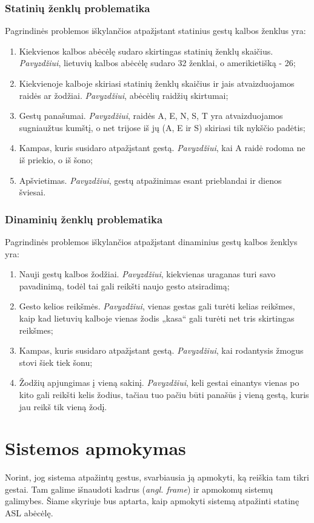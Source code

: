 \documentclass{VUMIFInfKursinis}
\begin{document}
\subsubsection{Statinių ženklų problematika}
Pagrindinės problemos iškylančios atpažįstant statinius gestų kalbos ženklus yra:
\begin{enumerate}
	\item Kiekvienos kalbos abėcėlę sudaro skirtingas statinių ženklų skaičius. \textit{Pavyzdžiui}, lietuvių kalbos abėcėlę sudaro 32 ženklai, o amerikietišką - 26; 
	\item Kiekvienoje kalboje skiriasi statinių ženklų skaičius ir jais atvaizduojamos raidės ar žodžiai. \textit{Pavyzdžiui}, abėcėlių raidžių skirtumai;
	\item Gestų panašumai. \textit{Pavyzdžiui}, raidės A, E, N, S, T yra atvaizduojamos sugniaužtus kumštį, o net trijose iš jų (A, E ir S) skiriasi tik nykščio padėtis;
	\item Kampas, kuris susidaro atpažįstant gestą. \textit{Pavyzdžiui}, kai A raidė rodoma ne iš priekio, o iš šono;
	\item Apšvietimas. \textit{Pavyzdžiui}, gestų atpažinimas esant prieblandai ir dienos šviesai.
\end{enumerate}
\subsubsection{Dinaminių ženklų problematika}
Pagrindinės problemos iškylančios atpažįstant dinaminius gestų kalbos ženklys yra:
\begin{enumerate}
	\item Nauji gestų kalbos žodžiai. \textit{Pavyzdžiui}, kiekvienas uraganas turi savo pavadinimą, todėl tai gali reikšti naujo gesto atsiradimą; 
	\item Gesto kelios reikšmės. \textit{Pavyzdžiui}, vienas gestas gali turėti kelias reikšmes, kaip kad lietuvių kalboje vienas žodis „kasa“ gali turėti net tris skirtingas reikšmes;
	\item Kampas, kuris susidaro atpažįstant gestą. \textit{Pavyzdžiui}, kai rodantysis žmogus stovi šiek tiek šonu;
	\item Žodžių apjungimas į vieną sakinį. \textit{Pavyzdžiui}, keli gestai einantys vienas po kito gali reikšti kelis žodius, tačiau tuo pačiu būti panašūs į vieną gestą, kuris jau reikš tik vieną žodį.
\end{enumerate}

\section{Sistemos apmokymas}
Norint, jog sistema atpažintų gestus, svarbiausia ją apmokyti, ką reiškia tam tikri gestai. Tam galime išnaudoti kadrus (\textit{angl. frame}) ir apmokomų sistemų galimybes. Šiame skyriuje bus aptarta, kaip apmokyti sistemą atpažinti statinę ASL abėcėlę.
\end{document}
